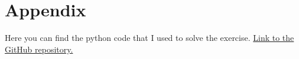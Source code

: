 \documentclass[hidelinks,12pt]{article}
\begin{document}
\FloatBarrier
\appendix

\section*{Appendix}

Here you can find the python code that I used to solve the exercise. \href{https://github.com/mortezaaghajanzadeh/BDAP/tree/main/Assignments/Assignment 4}{Link to the GitHub repository.}
\end{document}
